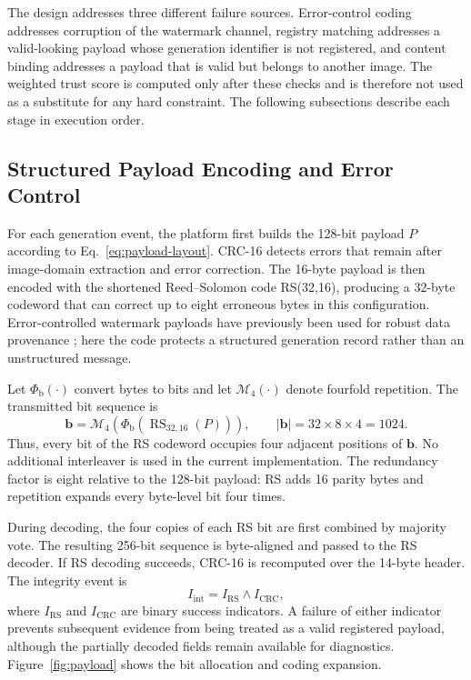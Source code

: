 \documentclass[a4paper,fleqn]{cas-sc}
\begin{document}
The design addresses three different failure sources. Error-control coding
addresses corruption of the watermark channel, registry matching addresses a
valid-looking payload whose generation identifier is not registered, and
content binding addresses a payload that is valid but belongs to another
image. The weighted trust score is computed only after these checks and is
therefore not used as a substitute for any hard constraint. The following
subsections describe each stage in execution order.

\subsection{Structured Payload Encoding and Error Control}
For each generation event, the platform first builds the 128-bit payload
$P$ according to Eq.~\eqref{eq:payload-layout}. CRC-16 detects errors that
remain after image-domain extraction and error correction. The 16-byte payload
is then encoded with the shortened Reed--Solomon code RS(32,16), producing a
32-byte codeword that can correct up to eight erroneous bytes in this
configuration. Error-controlled watermark payloads have previously been used
for robust data provenance \cite{saberi_drew_2024}; here the code protects a
structured generation record rather than an unstructured message.

Let $\Phi_{\mathrm{b}}(\cdot)$ convert bytes to bits and let
$\mathcal{M}_4(\cdot)$ denote fourfold repetition. The transmitted bit sequence
is
\begin{equation}
  \mathbf{b}
  =\mathcal{M}_4\!\left(
    \Phi_{\mathrm{b}}\!\left(
      \operatorname{RS}_{32,16}(P)
    \right)
  \right),
  \qquad
  |\mathbf{b}|=32\times8\times4=1024.
  \label{eq:coded-payload}
\end{equation}
Thus, every bit of the RS codeword occupies four adjacent positions of
$\mathbf{b}$. No additional interleaver is used in the current
implementation. The redundancy factor is eight relative to the 128-bit
payload: RS adds 16 parity bytes and repetition expands every byte-level bit
four times.

During decoding, the four copies of each RS bit are first combined by majority
vote. The resulting 256-bit sequence is byte-aligned and passed to the RS
decoder. If RS decoding succeeds, CRC-16 is recomputed over the 14-byte header.
The integrity event is
\begin{equation}
  I_{\mathrm{int}}
  =I_{\mathrm{RS}}\wedge I_{\mathrm{CRC}},
  \label{eq:integrity-gate}
\end{equation}
where $I_{\mathrm{RS}}$ and $I_{\mathrm{CRC}}$ are binary success indicators.
A failure of either indicator prevents subsequent evidence from being treated
as a valid registered payload, although the partially decoded fields remain
available for diagnostics. Figure~\ref{fig:payload} shows the bit allocation
and coding expansion.
\end{document}
